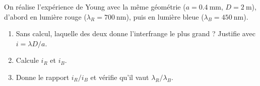 \documentclass[11pt,a4paper]{article}
\begin{document}
\begin{exo}
On réalise l'expérience de Young avec la même géométrie ($a=\SI{0.4}{\milli\metre}$,
$D=\SI{2}{\metre}$), d'abord en lumière rouge ($\lambda_R=\SI{700}{\nano\metre}$), puis en
lumière bleue ($\lambda_B=\SI{450}{\nano\metre}$).
\begin{enumerate}[label=\alph*)]
  \item Sans calcul, laquelle des deux donne l'interfrange le plus grand ? Justifie avec
        $i=\lambda D/a$.
  \item Calcule $i_R$ et $i_B$.
  \item Donne le rapport $i_R/i_B$ et vérifie qu'il vaut $\lambda_R/\lambda_B$.
\end{enumerate}
\end{exo}
\end{document}
